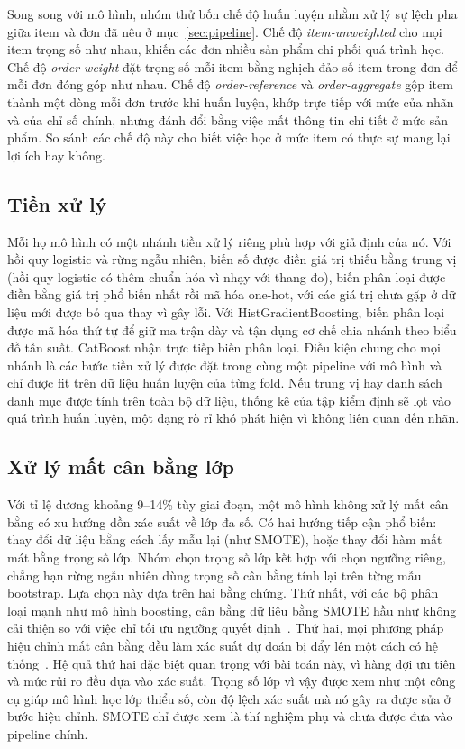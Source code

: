 Song song với mô hình, nhóm thử bốn chế độ huấn luyện nhằm xử lý sự lệch pha giữa item và đơn đã nêu ở mục~\ref{sec:pipeline}. Chế độ \emph{item-unweighted} cho mọi item trọng số như nhau, khiến các đơn nhiều sản phẩm chi phối quá trình học. Chế độ \emph{order-weight} đặt trọng số mỗi item bằng nghịch đảo số item trong đơn để mỗi đơn đóng góp như nhau. Chế độ \emph{order-reference} và \emph{order-aggregate} gộp item thành một dòng mỗi đơn trước khi huấn luyện, khớp trực tiếp với mức của nhãn và của chỉ số chính, nhưng đánh đổi bằng việc mất thông tin chi tiết ở mức sản phẩm. So sánh các chế độ này cho biết việc học ở mức item có thực sự mang lại lợi ích hay không.

\subsection{Tiền xử lý}

Mỗi họ mô hình có một nhánh tiền xử lý riêng phù hợp với giả định của nó. Với hồi quy logistic và rừng ngẫu nhiên, biến số được điền giá trị thiếu bằng trung vị (hồi quy logistic có thêm chuẩn hóa vì nhạy với thang đo), biến phân loại được điền bằng giá trị phổ biến nhất rồi mã hóa one-hot, với các giá trị chưa gặp ở dữ liệu mới được bỏ qua thay vì gây lỗi. Với HistGradientBoosting, biến phân loại được mã hóa thứ tự để giữ ma trận dày và tận dụng cơ chế chia nhánh theo biểu đồ tần suất. CatBoost nhận trực tiếp biến phân loại. Điều kiện chung cho mọi nhánh là các bước tiền xử lý được đặt trong cùng một pipeline với mô hình và chỉ được fit trên dữ liệu huấn luyện của từng fold. Nếu trung vị hay danh sách danh mục được tính trên toàn bộ dữ liệu, thống kê của tập kiểm định sẽ lọt vào quá trình huấn luyện, một dạng rò rỉ khó phát hiện vì không liên quan đến nhãn.

\subsection{Xử lý mất cân bằng lớp}

Với tỉ lệ dương khoảng 9--14\% tùy giai đoạn, một mô hình không xử lý mất cân bằng có xu hướng dồn xác suất về lớp đa số. Có hai hướng tiếp cận phổ biến: thay đổi dữ liệu bằng cách lấy mẫu lại (như SMOTE), hoặc thay đổi hàm mất mát bằng trọng số lớp. Nhóm chọn trọng số lớp kết hợp với chọn ngưỡng riêng, chẳng hạn rừng ngẫu nhiên dùng trọng số cân bằng tính lại trên từng mẫu bootstrap. Lựa chọn này dựa trên hai bằng chứng. Thứ nhất, với các bộ phân loại mạnh như mô hình boosting, cân bằng dữ liệu bằng SMOTE hầu như không cải thiện so với việc chỉ tối ưu ngưỡng quyết định~\cite{elor2022smote}. Thứ hai, mọi phương pháp hiệu chỉnh mất cân bằng đều làm xác suất dự đoán bị đẩy lên một cách có hệ thống~\cite{vandengoorbergh2022}. Hệ quả thứ hai đặc biệt quan trọng với bài toán này, vì hàng đợi ưu tiên và mức rủi ro đều dựa vào xác suất. Trọng số lớp vì vậy được xem như một công cụ giúp mô hình học lớp thiểu số, còn độ lệch xác suất mà nó gây ra được sửa ở bước hiệu chỉnh. SMOTE chỉ được xem là thí nghiệm phụ và chưa được đưa vào pipeline chính.

